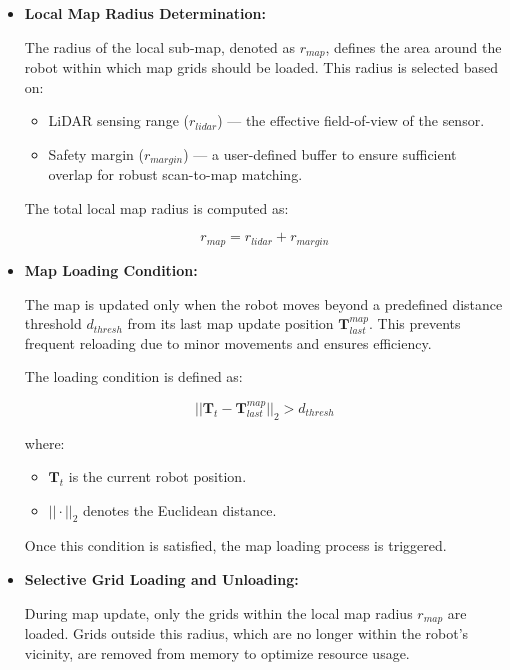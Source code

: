 \begin{itemize}
	\item \textbf{Local Map Radius Determination:} 
	
	The radius of the local sub-map, denoted as $r_{map}$, defines the area around the robot within which map grids should be loaded. This radius is selected based on:
	
	\begin{itemize}
		\item LiDAR sensing range ($r_{lidar}$) — the effective field-of-view of the sensor.
		\item Safety margin ($r_{margin}$) — a user-defined buffer to ensure sufficient overlap for robust scan-to-map matching.
	\end{itemize}
	
	The total local map radius is computed as:
	
	\begin{equation}
		r_{map} = r_{lidar} + r_{margin}
	\end{equation}
	
	\item \textbf{Map Loading Condition:}
	
	The map is updated only when the robot moves beyond a predefined distance threshold $d_{thresh}$ from its last map update position $\mathbf{T}_{last}^{map}$. This prevents frequent reloading due to minor movements and ensures efficiency.
	
	The loading condition is defined as:
	
	\begin{equation}
		||\mathbf{T}_t - \mathbf{T}_{last}^{map}||_2 > d_{thresh}
	\end{equation}
	
	where:
	\begin{itemize}
		\item $\mathbf{T}_t$ is the current robot position.
		\item $|| \cdot ||_2$ denotes the Euclidean distance.
	\end{itemize}
	
	Once this condition is satisfied, the map loading process is triggered.
	
	\item \textbf{Selective Grid Loading and Unloading:}
	
	During map update, only the grids within the local map radius $r_{map}$ are loaded. Grids outside this radius, which are no longer within the robot's vicinity, are removed from memory to optimize resource usage.
	

\end{itemize}
